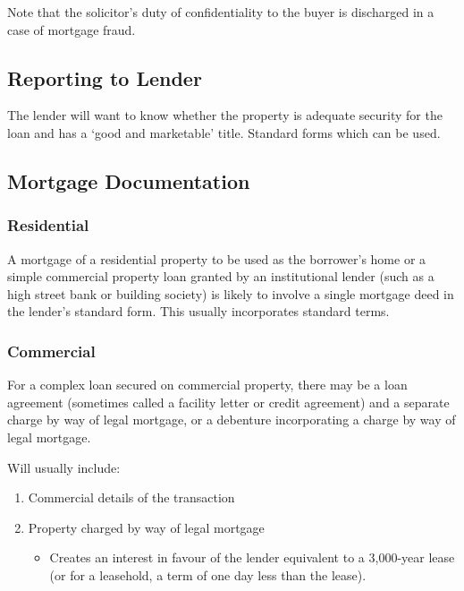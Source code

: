 \documentclass[
]{article}
\providecommand{\tightlist}{%
  \setlength{\itemsep}{0pt}\setlength{\parskip}{0pt}}
\begin{document}
Note that the solicitor's duty of confidentiality to the buyer is
discharged in a case of mortgage fraud.

\hypertarget{reporting-to-lender}{%
\subsection{Reporting to Lender}\label{reporting-to-lender}}

The lender will want to know whether the property is adequate security
for the loan and has a `good and marketable' title. Standard forms which
can be used.

\hypertarget{mortgage-documentation}{%
\subsection{Mortgage Documentation}\label{mortgage-documentation}}

\hypertarget{residential}{%
\subsubsection{Residential}\label{residential}}

A mortgage of a residential property to be used as the borrower's home
or a simple commercial property loan granted by an institutional lender
(such as a high street bank or building society) is likely to involve a
single mortgage deed in the lender's standard form. This usually
incorporates standard terms.

\hypertarget{commercial}{%
\subsubsection{Commercial}\label{commercial}}

For a complex loan secured on commercial property, there may be a loan
agreement (sometimes called a facility letter or credit agreement) and a
separate charge by way of legal mortgage, or a debenture incorporating a
charge by way of legal mortgage.

Will usually include:

\begin{enumerate}
\def\labelenumi{\arabic{enumi}.}
\tightlist
\item
  Commercial details of the transaction
\item
  Property charged by way of legal mortgage

  \begin{itemize}
  \tightlist
  \item
    Creates an interest in favour of the lender equivalent to a
    3,000-year lease (or for a leasehold, a term of one day less than
    the lease).
  \end{itemize}
\end{enumerate}
\end{document}
